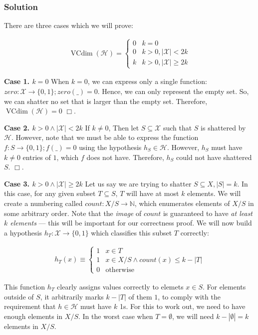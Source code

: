 \documentclass[11pt]{article}
\newcommand{\N}{\ensuremath{\mathbb{N}}}
\renewcommand{\H}{\ensuremath{\mathcal{H}}}
\newcommand{\X}{\ensuremath{\mathcal{X}}}
\DeclareMathOperator{\vcdim}{VCdim}
\newcommand{\Vcdim}{\ensuremath{\vcdim}}
\newcommand{\vc}{\ensuremath{\vcdim}}
\def\qed{$\Box$}
\begin{document}
\subsubsection*{Solution}
There are three cases which we will prove:

\begin{align*}
    \Vcdim(\H) = 
    \begin{cases}
        0 & k = 0 \\
        0 & k > 0, |\X| < 2k \\
        k & k > 0, |\X| \geq 2k
    \end{cases}
\end{align*}


\textbf{Case 1. $k = 0$} 
When $k=0$, we can express only a single function:
$zero: \X \rightarrow \{0, 1\}; zero(\_) = 0$. Hence, we can only represent
the empty set. So, we can shatter no set that is larger than the empty set.
Therefore, $\vc(\H) = 0$ \qed.

\textbf{Case 2. $k > 0 \land |\X| < 2k$} 
If $k \neq 0$, Then let $S \subseteq \X$ such that $S$ is shattered by $\H$.
However, note that we must be able to express the function $f: S \rightarrow \{0, 1\}; f(\_) = 0$
using the hypothesis $h_S \in \H$. However, $h_S$ must have $k \neq 0$ entries of $1$,
which $f$ does not have. Therefore, $h_S$ could not have shattered $S$. \qed.


\textbf{Case 3. $k > 0 \land |\X| \geq 2k$} 
Let us say we are trying to shatter $S \subseteq X, |S| = k$. In this case,
for any given subset $T \subseteq S$, $T$ will have at most $k$ elements. We will
create a numbering called $count: X / S \rightarrow \N$, which enumerates elements
of $X/S$ in some arbitrary order. Note that the \emph{image} of $count$ is
guaranteed to have \emph{at least $k$ elements} --- this will be important for
our correctness proof. We will now build a hypothesis $h_T: \X \rightarrow \{0, 1\}$
which classifies this subset $T$ correctly:

\begin{align*}
    h_T(x) \equiv 
    \begin{cases}
        1 & x \in T \\
        1 & x \in X / S \land count(x) \leq k - |T|  \\
        0 & \text{otherwise}
    \end{cases}
\end{align*}

This function $h_T$ clearly assigns values correctly to elemets $x \in S$.
For elements outside of $S$, it arbitrarily marks $k - |T|$ of them $1$, to
comply with the requirement that $h \in \H$ must have $k$ 1s. For this
to work out, we need to have enough elements in $X / S$. In the worst case
when $T = \emptyset$, we will need $k - |\emptyset| = k$ elements in $X / S$.
\end{document}

